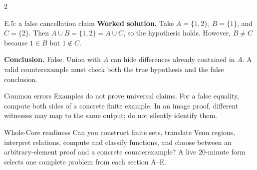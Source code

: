 \documentclass[10pt]{article}
\begin{document}
\begin{multicols}{2}
\begin{workedbox}{E.5: a false cancellation claim}
\textbf{Worked solution.} Take $A=\{1,2\}$, $B=\{1\}$, and $C=\{2\}$.
Then $A\cup B=\{1,2\}=A\cup C$, so the hypothesis holds. However,
$B\ne C$ because $1\in B$ but $1\notin C$.

\textbf{Conclusion.} False. Union with $A$ can hide differences already
contained in $A$. A valid counterexample must check both the true hypothesis
and the false conclusion.
\end{workedbox}

\begin{warningbox}{Common errors}
Examples do not prove universal claims. For a false equality, compute both
sides of a concrete finite example. In an image proof, different witnesses may
map to the same output; do not silently identify them.
\end{warningbox}

\begin{checklistbox}{Whole-Core readiness}
Can you construct finite sets, translate Venn regions, interpret relations,
compute and classify functions, and choose between an arbitrary-element proof
and a concrete counterexample? A live 20-minute form selects one complete
problem from each section A--E.
\end{checklistbox}
\end{multicols}
\end{document}
